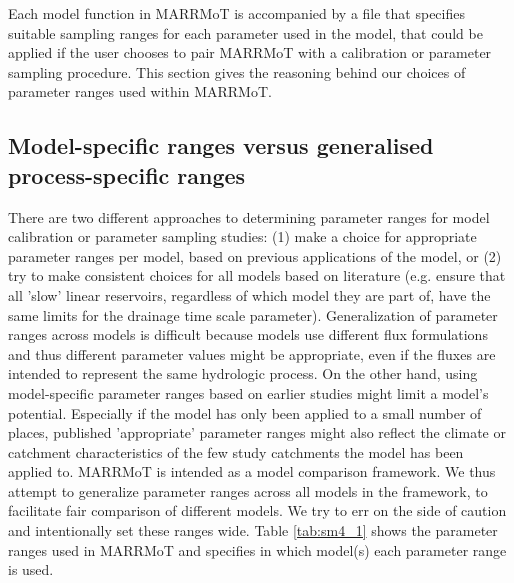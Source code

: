 Each model function in MARRMoT is accompanied by a file that specifies suitable sampling ranges for each parameter used in the model, that could be applied if the user chooses to pair MARRMoT with a calibration or parameter sampling procedure. This section gives the reasoning behind our choices of parameter ranges used within MARRMoT.

\subsection{Model-specific ranges versus generalised process-specific ranges}
There are two different approaches to determining parameter ranges for model calibration or parameter sampling studies: (1) make a choice for appropriate parameter ranges per model, based on previous applications of the model, or (2) try to make consistent choices for all models based on literature (e.g. ensure that all 'slow' linear reservoirs, regardless of which model they are part of, have the same limits for the drainage time scale parameter). 
Generalization of parameter ranges across models is difficult because models use different flux formulations and thus different parameter values might be appropriate, even if the fluxes are intended to represent the same hydrologic process. 
On the other hand, using model-specific parameter ranges based on earlier studies might limit a model's potential. 
Especially if the model has only been applied to a small number of places, published 'appropriate' parameter ranges might also reflect the climate or catchment characteristics of the few study catchments the model has been applied to. 
MARRMoT is intended as a model comparison framework. 
We thus attempt to generalize parameter ranges across all models in the framework, to facilitate fair comparison of different models. 
We try to err on the side of caution and intentionally set these ranges wide. 
Table \ref{tab:sm4_1} shows the parameter ranges used in MARRMoT and specifies in which model(s) each parameter range is used.


\clearpage
{}
\recalctypearea

\pagestyle{styleLandscapeA4}


\setlength\LTleft{-2in}
\setlength\LTright{-2in}

